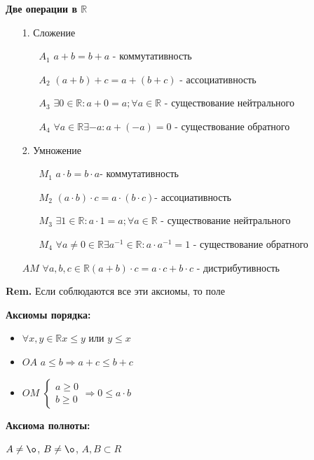 \documentclass[14pt, letter paper]{article}
\begin{document}
\textbf{Две операции в $\mathds{R}$}
\begin{itemize}
    \item[1.] Сложение
    \begin{itemize}
        \item[$A_1$] $a + b = b + a$ - коммутативность
        \item[$A_2$] $(a + b) + c = a + (b + c)$ - ассоциативность
        \item[$A_3$] $\exists 0 \in \mathds{R} : a + 0 = a; \forall a \in \mathds{R}$ - существование нейтрального
        \item[$A_4$] $\forall a \in \mathds{R} \exists -a : a + (-a) = 0$ - существование обратного
    \end{itemize}
    \item[2.] Умножение
    \begin{itemize}
        \item[$M_1$] $a \cdot b = b \cdot a$- коммутативность
        \item[$M_2$] $(a \cdot b) \cdot c = a \cdot (b \cdot c)$- ассоциативность
        \item[$M_3$] $\exists 1 \in \mathds{R} : a \cdot 1 = a; \forall a \in \mathds{R}$ - существование нейтрального
        \item[$M_4$] $\forall a \neq 0 \in \mathds{R} \exists a^{-1} \in \mathds{R} : a \cdot a^{-1} = 1$ - существование обратного
    \end{itemize}
    \item[$AM$] $\forall a, b, c \in \mathds{R} (a + b) \cdot c = a \cdot c + b \cdot c$ - дистрибутивность
\end{itemize}

\textbf{Rem.} Если соблюдаются все эти аксиомы, то поле

\textbf{Аксиомы порядка:}
\begin{itemize}
    \item $\forall x, y \in \mathds{R} x \leq y$ или $y \leq x$
    \item $OA$ $a \leq b \Rightarrow a + c \leq b + c$
    \item $OM$ $\begin{cases} a \geq 0 \\ b \geq 0 \end{cases} \Rightarrow 0 \leq a \cdot b$
\end{itemize}

\textbf{Аксиома полноты:}

$A \neq \o$, $B \neq \o$, $A, B \subset R$
\end{document}
